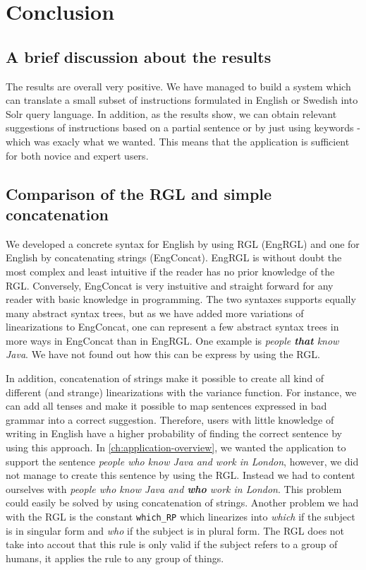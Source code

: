 \chapter{Conclusion}\label{ch:conclusion}
\section{A brief discussion about the results}
The results are overall very positive. We have managed to build a system which can translate a small subset of instructions formulated in English or Swedish into Solr query language. In addition, as the results show, we can obtain relevant suggestions of instructions based on a partial sentence or by just using keywords - which was exacly what we wanted. This means that the application is sufficient for both novice and expert users\cite{mayer:2007}.

\section{Comparison of the RGL and simple concatenation}\label{sec:comparison}
We developed a concrete syntax for English by using RGL (EngRGL) and one for English by concatenating strings (EngConcat). EngRGL is without doubt the most complex and least intuitive if the reader has no prior knowledge of the RGL. Conversely, EngConcat is very instuitive and straight forward for any reader with basic knowledge in programming. The two syntaxes supports equally many abstract syntax trees, but as we have added more variations of linearizations to EngConcat, one can represent a few abstract syntax trees in more ways in EngConcat than in EngRGL. One example is \emph{people \textbf{that} know Java}. We have not found out how this can be express by using the RGL.

In addition, concatenation of strings make it possible to create all kind of different (and strange) linearizations with the variance function. For instance, we can add all tenses and make it possible to map sentences expressed in bad grammar into a correct suggestion. Therefore, users with little knowledge of writing in English have a higher probability of finding the correct sentence by using this approach.
\newline
\newline
In \autoref{ch:application-overview}, we wanted the application to support the sentence \emph{people who know Java and work in London}, however, we did not manage to create this sentence by using the RGL. Instead we had to content ourselves with \emph{people who know Java and \textbf{who} work in London}. This problem could easily be solved by using concatenation of strings.
\newline
\newline
Another problem we had with the RGL is the constant \texttt{which\_RP} which linearizes into \emph{which} if the subject is in singular form and \emph{who} if the subject is in plural form. The RGL does not take into accout that this rule is only valid if the subject refers to a group of humans, it applies the rule to any group of things.

